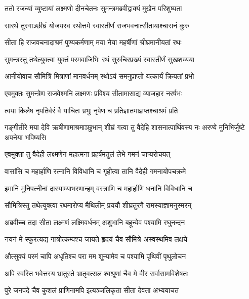 
\twolineshloka
{ततो रजन्यां व्युष्टायां लक्ष्मणो दीनचेतनः}
{सुमन्त्रमब्रवीद्वाक्यं मुखेन परिशुष्यता} %

\twolineshloka
{सारथे तुरगाञ्छीघ्रं योजयस्व रथोत्तमे}
{स्वास्तीर्णं राजभवनात्सीतायाश्चासनं कुरु} %

\twolineshloka
{सीता हि राजवचनादाश्रमं पुण्यकर्मणाम्}
{मया नेया महर्षीणां श्रीघ्रमानीयतां रथः} %

\twolineshloka
{सुमन्त्रस्तु तथेत्युक्त्वा युक्तं परमवाजिभिः}
{रथं सुरुचिरप्रख्यं स्वास्तीर्णं सुखशय्यया} %

\twolineshloka
{आनीयोवाच सौमित्रिं मित्राणां मानवर्धनम्}
{रथोऽयं समनुप्राप्तो यत्कार्यं क्रियतां प्रभो} %

\twolineshloka
{एवमुक्तः सुमन्त्रेण राजवेश्मनि लक्ष्मणः}
{प्रविश्य सीतामासाद्य व्याजहार नरर्षभः} %

\twolineshloka
{त्वया किलैष नृपतिर्वरं वै याचितः प्रभुः}
{नृपेण च प्रतिज्ञातमाज्ञप्तश्चाश्रमं प्रति} %

\threelineshloka
{गङ्गीतीरे मया देवि ऋषीणामाश्रमाञ्छुभान्}
{शीघ्रं गत्वा तु वैदेहि शासनात्पार्थिवस्य नः}
{अरण्ये मुनिभिर्जुष्टे अपनेया भविष्यसि} %

\twolineshloka
{एवमुक्ता तु वैदेही लक्ष्मणेन महात्मना}
{प्रहर्षमतुलं लेभे गमनं चाप्यरोचयत्} %

\twolineshloka
{वासांसि च महार्हाणि रत्नानि विविधानि च}
{गृहीत्वा तानि वैदेही गमनायोपचक्रमे} %

\twolineshloka
{इमानि मुनिपत्नीनां दास्याम्याभरणान्हम्}
{वस्त्राणि च महार्हाणि धनानि विविधानि च} %

\twolineshloka
{सौमित्रिस्तु तथेत्युक्त्वा रथमारोप्य मैथिलीम्}
{प्रययौ शीघ्रतुरगै रामस्याज्ञामनुस्मरन्} %

\twolineshloka
{अब्रवीच्च तदा सीता लक्ष्मणं लक्ष्मिवर्धनम्}
{अशुभानि बहून्येव पश्यामि रघुनन्दन} %

\twolineshloka
{नयनं मे स्फुरत्यद्य गात्रोत्कम्पश्च जायते}
{हृदयं चैव सौमित्रे अस्वस्थमिव लक्षये} %

\twolineshloka
{औत्सुक्यं परमं चापि अधृतिश्च परा मम}
{शून्यामेव च पश्यामि पृथिवीं पृथुलोचन} %

\twolineshloka
{अपि स्वस्ति भवेत्तस्य भ्रातुस्ते भ्रातृवत्सल}
{श्वश्रूणां चैव मे वीर सर्वासामविशेषतः} %

\twolineshloka
{पुरे जनपदे चैव कुशलं प्राणिनामपि}
{इत्यञ्जलिकृता सीता देवता अभ्ययाचत} %

